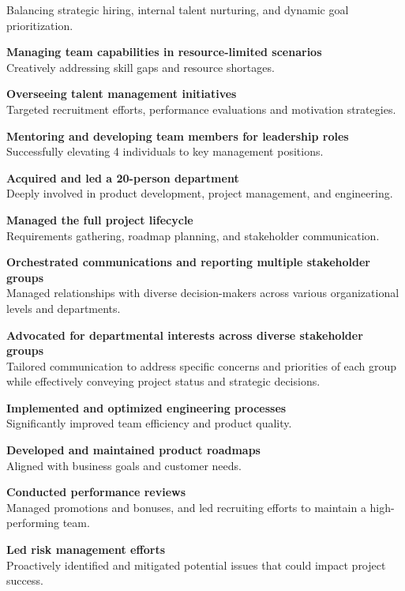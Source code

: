 \documentclass[]{private}
\begin{document}
\begin{paracol}{2}
\begin{tightemize}
        Balancing strategic hiring, internal talent nurturing, and dynamic goal prioritization.
        \item \textbf{Managing team capabilities in resource-limited scenarios}\\
        Creatively addressing skill gaps and resource shortages.
        \item \textbf{Overseeing talent management initiatives} \\
        Targeted recruitment efforts, performance evaluations and motivation strategies.
        \item \textbf{Mentoring and developing team members for leadership roles}\\ 
        Successfully elevating 4 individuals to key management positions.
    \end{tightemize}
    \sectionsep
    
    \vspace{\topsep}
    \begin{tightemize}
        \item \textbf{Acquired and led a 20-person department} \\ Deeply involved in product development, project management, and engineering.
        \item \textbf{Managed the full project lifecycle} \\ Requirements gathering, roadmap planning, and stakeholder communication.
        \item \textbf{Orchestrated communications and reporting multiple stakeholder groups} \\Managed relationships with diverse decision-makers across various organizational levels and departments.
        \item \textbf{Advocated for departmental interests across diverse stakeholder groups} \\ Tailored communication to address specific concerns and priorities of each group while effectively conveying project status and strategic decisions.
        \item \textbf{Implemented and optimized engineering processes} \\ Significantly improved team efficiency and product quality.
        \item \textbf{Developed and maintained product roadmaps} \\ Aligned with business goals and customer needs.
        \item \textbf{Conducted performance reviews} \\ Managed promotions and bonuses, and led recruiting efforts to maintain a high-performing team.
        \item \textbf{Led risk management efforts}\\ Proactively identified and mitigated potential issues that could impact project success.
    \end{tightemize}
    \sectionsep



\end{paracol}
\end{document}
